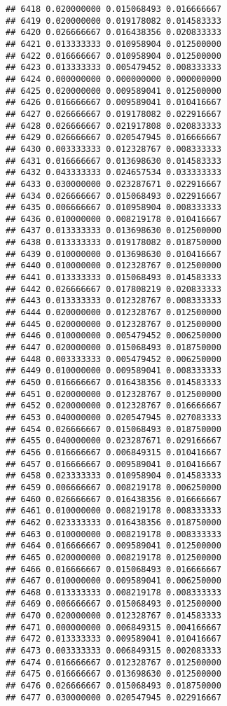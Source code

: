 \documentclass[
]{article}
\begin{document}
\begin{verbatim}
## 6418 0.020000000 0.015068493 0.016666667
## 6419 0.020000000 0.019178082 0.014583333
## 6420 0.026666667 0.016438356 0.020833333
## 6421 0.013333333 0.010958904 0.012500000
## 6422 0.016666667 0.010958904 0.012500000
## 6423 0.013333333 0.005479452 0.008333333
## 6424 0.000000000 0.000000000 0.000000000
## 6425 0.020000000 0.009589041 0.012500000
## 6426 0.016666667 0.009589041 0.010416667
## 6427 0.026666667 0.019178082 0.022916667
## 6428 0.026666667 0.021917808 0.020833333
## 6429 0.026666667 0.020547945 0.016666667
## 6430 0.003333333 0.012328767 0.008333333
## 6431 0.016666667 0.013698630 0.014583333
## 6432 0.043333333 0.024657534 0.033333333
## 6433 0.030000000 0.023287671 0.022916667
## 6434 0.026666667 0.015068493 0.022916667
## 6435 0.006666667 0.010958904 0.008333333
## 6436 0.010000000 0.008219178 0.010416667
## 6437 0.013333333 0.013698630 0.012500000
## 6438 0.013333333 0.019178082 0.018750000
## 6439 0.010000000 0.013698630 0.010416667
## 6440 0.010000000 0.012328767 0.012500000
## 6441 0.013333333 0.015068493 0.014583333
## 6442 0.026666667 0.017808219 0.020833333
## 6443 0.013333333 0.012328767 0.008333333
## 6444 0.020000000 0.012328767 0.012500000
## 6445 0.020000000 0.012328767 0.012500000
## 6446 0.010000000 0.005479452 0.006250000
## 6447 0.020000000 0.015068493 0.018750000
## 6448 0.003333333 0.005479452 0.006250000
## 6449 0.010000000 0.009589041 0.008333333
## 6450 0.016666667 0.016438356 0.014583333
## 6451 0.020000000 0.012328767 0.012500000
## 6452 0.020000000 0.012328767 0.016666667
## 6453 0.040000000 0.020547945 0.027083333
## 6454 0.026666667 0.015068493 0.018750000
## 6455 0.040000000 0.023287671 0.029166667
## 6456 0.016666667 0.006849315 0.010416667
## 6457 0.016666667 0.009589041 0.010416667
## 6458 0.023333333 0.010958904 0.014583333
## 6459 0.006666667 0.008219178 0.006250000
## 6460 0.026666667 0.016438356 0.016666667
## 6461 0.010000000 0.008219178 0.008333333
## 6462 0.023333333 0.016438356 0.018750000
## 6463 0.010000000 0.008219178 0.008333333
## 6464 0.016666667 0.009589041 0.012500000
## 6465 0.020000000 0.008219178 0.012500000
## 6466 0.016666667 0.015068493 0.016666667
## 6467 0.010000000 0.009589041 0.006250000
## 6468 0.013333333 0.008219178 0.008333333
## 6469 0.006666667 0.015068493 0.012500000
## 6470 0.020000000 0.012328767 0.014583333
## 6471 0.000000000 0.006849315 0.004166667
## 6472 0.013333333 0.009589041 0.010416667
## 6473 0.003333333 0.006849315 0.002083333
## 6474 0.016666667 0.012328767 0.012500000
## 6475 0.016666667 0.013698630 0.012500000
## 6476 0.026666667 0.015068493 0.018750000
## 6477 0.030000000 0.020547945 0.022916667

\end{verbatim}
\end{document}
